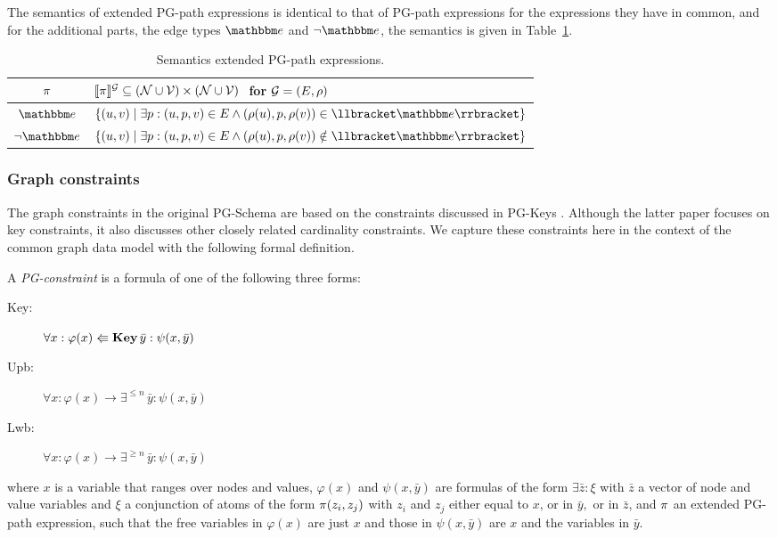 The semantics of extended PG-path expressions is identical to that of PG-path expressions for the expressions they have in common, and for the additional parts, the edge types $\etype$ and $\lnot \etype$, the semantics is given in Table~\ref{tab:semSPGtypes}.

\begin{table}[tb]
  \caption{Semantics extended PG-path expressions.}
  \label{tab:semSPGtypes}  
  \centering
  \begin{tabular}{cl}
    \toprule
    $\pi$ & $\llbracket{\pi}\rrbracket^{\mathcal{G}}\subseteq (\mathcal{N}\cup\mathcal{V})\times (\mathcal{N}\cup\mathcal{V})\ $  for  $\mathcal{G} = (E, \rho)$ \\[2pt]
    \midrule    
    $\etype$ & $\left\{ (u, v) \mid \exists p : (u, p, v) \in E \land (\rho(u), p, \rho(v)) \in \sem{\etype} \right\}$ \\
    $\lnot \etype$ & $\left\{ (u, v) \mid \exists p : (u, p, v) \in E \land (\rho(u), p, \rho(v)) \notin \sem{\etype} \right\}$ \\
    \bottomrule
  \end{tabular}
\end{table}

\subsubsection{Graph constraints}

The graph constraints in the original PG-Schema are based on the constraints discussed in PG-Keys \cite{ABDF21}. 
Although the latter paper focuses on key constraints, it also discusses other closely related cardinality constraints. 
We capture these constraints here in the context of the common graph data model with the following formal definition.

\begin{definition}[PG-constraint]
 A \emph{PG-constraint} is a formula of one of the following three forms:
\begin{description}
    \item[Key:] $\forall x : \varphi(x) \Lleftarrow \textsf{\bf Key} \, \bar{y} : \psi(x, \bar{y})$
    \item[Upb:] $\forall x : \varphi(x) \to \exists^{\leq n} \, \bar{y} : \psi(x, \bar{y})$
    \item[Lwb:] $\forall x : \varphi(x) \to \exists^{\geq n} \, \bar{y} : \psi(x, \bar{y})$
\end{description}
where $x$ is a variable that ranges over nodes and values, $\varphi(x)$ and $\psi(x, \bar{y})$ are formulas of the form $\exists \bar{z} : \xi$ with $\bar{z}$ a vector of node and value variables and $\xi$ a conjunction of atoms of the form $\pi(z_i, z_j)$ with $z_i$ and $z_j$ either equal to $x$, or in $\bar{y},$ or in $\bar{z}$, and $\pi$ an extended PG-path expression, such that the free variables in $\varphi(x)$ are just $x$ and those in $\psi(x, \bar{y})$ are $x$ and the variables in $\bar{y}$. 
 \end{definition}

